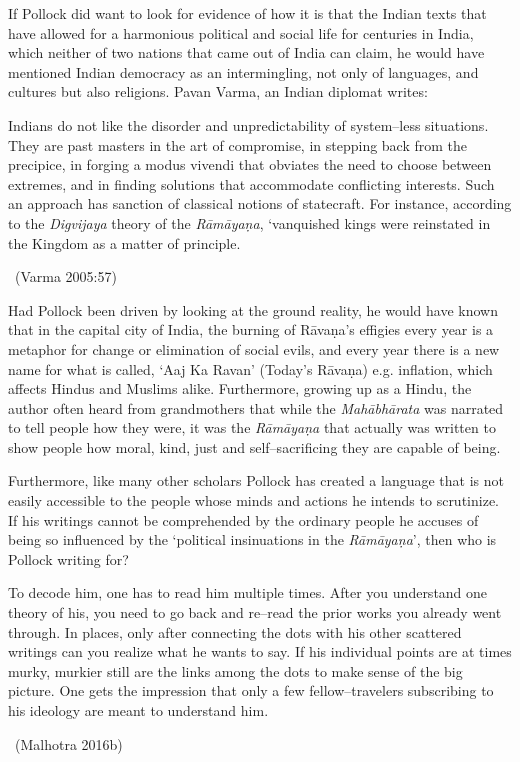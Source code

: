 If Pollock did want to look for evidence of how it is that the Indian texts that have allowed for a harmonious political and social life for centuries in India, which neither of two nations that came out of India can claim, he would have mentioned Indian democracy as an intermingling, not only of languages, and cultures but also religions. Pavan Varma, an Indian diplomat writes:

\begin{myquote}
Indians do not like the disorder and unpredictability of system–less situations. They are past masters in the art of compromise, in stepping back from the precipice, in forging a modus vivendi that obviates the need to choose between extremes, and in finding solutions that accommodate conflicting interests. Such an approach has sanction of classical notions of statecraft. For instance, according to the \textit{Digvijaya} theory of the \textit{Rāmāyaṇa}, ‘vanquished kings were reinstated in the Kingdom as a matter of principle. 

~\hfill (Varma 2005:57)
\end{myquote}

Had Pollock been driven by looking at the ground reality, he would have known that in the capital city of India, the burning of Rāvaṇa’s effigies every year is a metaphor for change or elimination of social evils, and every year there is a new name for what is called, ‘Aaj Ka Ravan’ (Today’s Rāvaṇa) e.g. inflation, which affects Hindus and Muslims alike. Furthermore, growing up as a Hindu, the author often heard from grandmothers that while the \textit{Mahābhārata} was narrated to tell people how they were, it was the \textit{Rāmāyaṇa} that actually was written to show people how moral, kind, just and self–sacrificing they are capable of being.

Furthermore, like many other scholars Pollock has created a language that is not easily accessible to the people whose minds and actions he intends to scrutinize. If his writings cannot be comprehended by the ordinary people he accuses of being so influenced by the ‘political insinuations in the \textit{Rāmāyaṇa}’, then who is Pollock writing for?

\begin{myquote}
To decode him, one has to read him multiple times. After you understand one theory of his, you need to go back and re–read the prior works you already went through. In places, only after connecting the dots with his other scattered writings can you realize what he wants to say. If his individual points are at times murky, murkier still are the links among the dots to make sense of the big picture. One gets the impression that only a few fellow–travelers subscribing to his ideology are meant to understand him. 

~\hfill (Malhotra 2016b)
\end{myquote}

